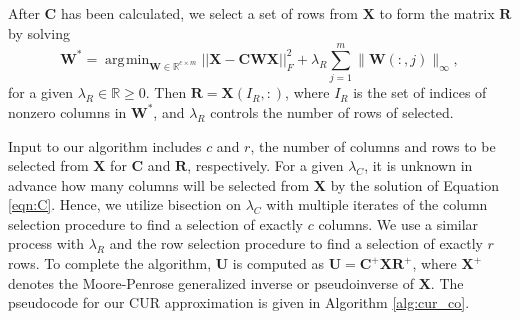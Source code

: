 \documentclass[12pt]{article}
\DeclareMathOperator*{\argmin}{\arg\!\min}
\begin{document}
After $\mathbf{C}$ has been calculated, we select a set of rows from $\mathbf{X}$ to form the matrix $\mathbf{R}$ by solving   
\begin{equation}
\label{eqn:R}
\mathbf{W^*} = \argmin_{\mathbf{W} \in \mathbb{R}^{c \times m}} ||\mathbf{X-CWX}||_F^2 + \lambda_R \sum_{j=1}^m \| \mathbf{W}(:,j) \|_{\infty},
\end{equation}
for a given $\lambda_R \in \mathbb{R} \geq 0$.  Then $\mathbf{R} = \mathbf{X}(I_R,:)$, where $I_R$ is the set of indices of nonzero columns in $\mathbf{W^*}$, and $\lambda_R$ controls the number of rows of selected.  

Input to our algorithm includes $c$ and $r$, the number of columns and rows to be selected from $\mathbf{X}$ for $\mathbf{C}$ and $\mathbf{R}$, respectively.  For a given $\lambda_C$, it is unknown in advance how many columns will be selected from $\mathbf{X}$ by the solution of Equation \ref{eqn:C}.  Hence, we utilize bisection on $\lambda_C$ with multiple iterates of the column selection procedure to find a selection of exactly $c$ columns.  We use a similar process with $\lambda_R$ and the row selection procedure to find a selection of exactly $r$ rows. To complete the algorithm, $\mathbf{U}$ is computed as $\mathbf{U = C^+XR^+}$, where $\mathbf{X}^+$ denotes the Moore-Penrose generalized inverse or pseudoinverse of $\mathbf{X}$. The pseudocode for our CUR approximation is given in Algorithm \ref{alg:cur_co}.
\end{document}
